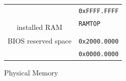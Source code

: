 \documentclass[12pt,a4paper,openright,twoside]{report}
\begin{document}
\begin{figure}[ht]
	\centering
	\renewcommand{\arraystretch}{0.75}
	\begin{tabular}{cl}
		                                                           & \multirow{2}{*}{\texttt{0xFFFF.FFFF}} \\ \hhline{-~}
		\multicolumn{1}{|c|}{\multirow{2}{*}{\cellcolor{gray}}}    &                                       \\ [-1ex]
		\multicolumn{1}{|c|}{\cellcolor{gray}}                     & \multirow{2}{*}{\texttt{RAMTOP}}      \\ \cline{1-1}
		\multicolumn{1}{|c|}{\multirow{4}{*}{installed RAM}}       &                                       \\
		\multicolumn{1}{|c|}{}                                     &                                       \\
		\multicolumn{1}{|c|}{}                                     &                                       \\
		\multicolumn{1}{|c|}{}                                     & \multirow{2}{*}{\texttt{0x2000.0000}} \\ \cline{1-1}
		\multicolumn{1}{|c|}{\multirow{2}{*}{BIOS reserved space}} &                                       \\
		\multicolumn{1}{|c|}{}                                     & \multirow{2}{*}{\texttt{0x0000.0000}} \\ \cline{1-1}
		\multicolumn{1}{l}{}                                       &
	\end{tabular}
	\caption{Physical Memory}
	\label{fig:physical_memory}
\end{figure}
\end{document}

